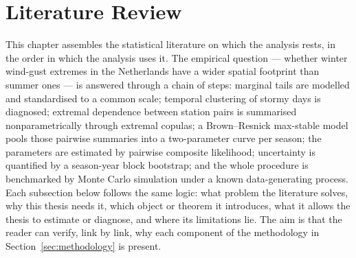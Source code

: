 \section{Literature Review}\label{sec:literature}

This chapter assembles the statistical literature on which the analysis rests, in the order in which the analysis uses it. The empirical question --- whether winter wind-gust extremes in the Netherlands have a wider spatial footprint than summer ones --- is answered through a chain of steps: marginal tails are modelled and standardised to a common scale; temporal clustering of stormy days is diagnosed; extremal dependence between station pairs is summarised nonparametrically through extremal copulas; a Brown--Resnick max-stable model pools those pairwise summaries into a two-parameter curve per season; the parameters are estimated by pairwise composite likelihood; uncertainty is quantified by a season-year block bootstrap; and the whole procedure is benchmarked by Monte Carlo simulation under a known data-generating process. Each subsection below follows the same logic: what problem the literature solves, why this thesis needs it, which object or theorem it introduces, what it allows the thesis to estimate or diagnose, and where its limitations lie. The aim is that the reader can verify, link by link, why each component of the methodology in Section~\ref{sec:methodology} is present.

